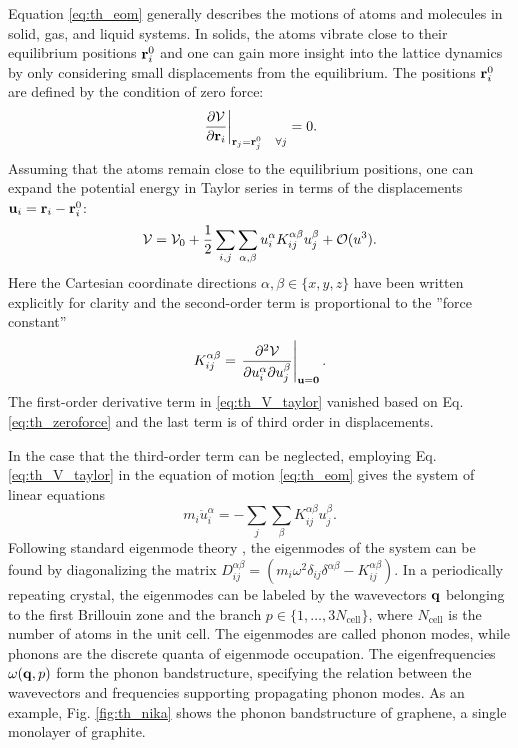 Equation \eqref{eq:th_eom} generally describes the motions of atoms and molecules in solid, gas, and liquid systems. In solids, the atoms vibrate close to their equilibrium positions $\mathbf{r}_i^0$ and one can gain more insight into the lattice dynamics by only considering small displacements from the equilibrium. The positions $\mathbf{r}_i^0$ are defined by the condition of zero force:
\begin{equation}
 \left. \frac{\partial \mathcal{V}}{\partial \mathbf{r}_i} \right|_{\mathbf{r}_j=\mathbf{r}_j^0 \quad \forall j} = 0. \label{eq:th_zeroforce}
\end{equation}
Assuming that the atoms remain close to the equilibrium positions, one can expand the potential energy in Taylor series in terms of the displacements $\mathbf{u}_i=\mathbf{r}_i-\mathbf{r}_i^0$:
\begin{equation}
 \mathcal{V} = \mathcal{V}_0 + \frac{1}{2} \sum_{i,j} \sum_{\alpha,\beta} u_i^{\alpha} K_{ij}^{\alpha \beta} u_j^{\beta}  + \mathcal{O}(u^3). \label{eq:th_V_taylor}
\end{equation}
Here the Cartesian coordinate directions $\alpha,\beta \in \{x,y,z\}$ have been written explicitly for clarity and the second-order term is proportional to the ''force constant''
\begin{equation}
 K_{ij}^{\alpha\beta} = \left. \frac{\partial^2 \mathcal{V}}{\partial u_i^{\alpha} \partial u_j^{\beta}} \right|_{\mathbf{u}=\mathbf{0}}. \label{eq:th_K_def}
\end{equation}
The first-order derivative term in \eqref{eq:th_V_taylor} vanished based on Eq. \eqref{eq:th_zeroforce} and the last term is of third order in displacements.

In the case that the third-order term can be neglected, employing Eq. \eqref{eq:th_V_taylor} in the equation of motion \eqref{eq:th_eom} gives the system of linear equations
\begin{equation}
 m_i \ddot{u}_i^{\alpha} = - \sum_j \sum_{\beta} K_{ij}^{\alpha\beta} u_j^{\beta}.
\end{equation}
Following standard eigenmode theory \cite{fetter}, the eigenmodes of the system can be found by diagonalizing the matrix $D_{ij}^{\alpha\beta} = (m_i\omega^2 \delta_{ij}\delta
^{\alpha\beta}-K_{ij}^{\alpha\beta})$. In a periodically repeating crystal, the eigenmodes can be labeled by the wavevectors $\mathbf{q}$ belonging to the first Brillouin zone \cite{ziman} and the branch $p \in \{1,\dots,3N_{\textrm{cell}}\}$, where $N_{\textrm{cell}}$ is the number of atoms in the unit cell. The eigenmodes are called phonon modes, while phonons are the discrete quanta of eigenmode occupation. The eigenfrequencies $\omega(\mathbf{q},p)$ form the phonon bandstructure, specifying the relation between the wavevectors and frequencies supporting propagating phonon modes. As an example, Fig. \ref{fig:th_nika} shows the phonon bandstructure of graphene, a single monolayer of graphite.

